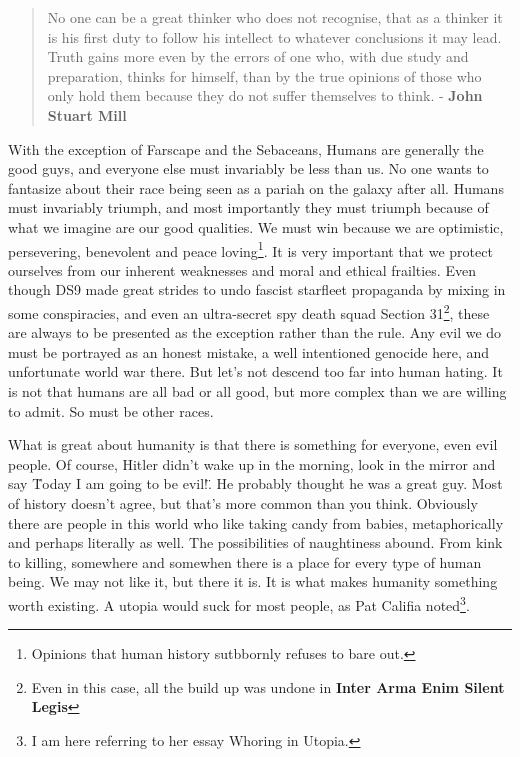 \begin{quote}
No one can be a great thinker who does not recognise, that as a thinker it is his first duty to follow his intellect to whatever conclusions it may lead. Truth gains more even by the errors of one who, with due study and preparation, thinks for himself, than by the true opinions of those who only hold them because they do not suffer themselves to think. - \textbf{John Stuart Mill}
\end{quote}

With the exception of Farscape and the Sebaceans, Humans are generally the good guys, and everyone else must invariably be less than us. No one wants to fantasize about their race being seen as a pariah on the galaxy after all. Humans must invariably triumph, and most importantly they must triumph because of what we imagine are our good qualities. We must win because we are optimistic, persevering, benevolent and peace loving\footnote{Opinions that human history sutbbornly refuses to bare out.}. It is very important that we protect ourselves from our inherent weaknesses and moral and ethical frailties. Even though DS9 made great strides to undo fascist starfleet propaganda by mixing in some conspiracies, and even an ultra-secret spy death squad Section 31\footnote{Even in this case, all the build up was undone in \textbf{Inter Arma Enim Silent Legis}}, these are always to be presented as the exception rather than the rule. Any evil we do must be portrayed as an honest mistake, a well intentioned genocide here, and unfortunate world war there. But let's not descend too far into human hating. It is not that humans are all bad or all good, but more complex than we are willing to admit. So must be other races.

What is great about humanity is that there is something for everyone, even evil people. Of course, Hitler didn't wake up in the morning, look in the mirror and say \"Today I am going to be evil!\". He probably thought he was a great guy. Most of history doesn't agree, but that's more common than you think. Obviously there are people in this world who like taking candy from babies, metaphorically and perhaps literally as well. The possibilities of naughtiness abound. From kink to killing, somewhere and somewhen there is a place for every type of human being. We may not like it, but there it is. It is what makes humanity something worth existing. A utopia would suck for most people, as Pat Califia noted\footnote{I am here referring to her essay Whoring in Utopia.}.

